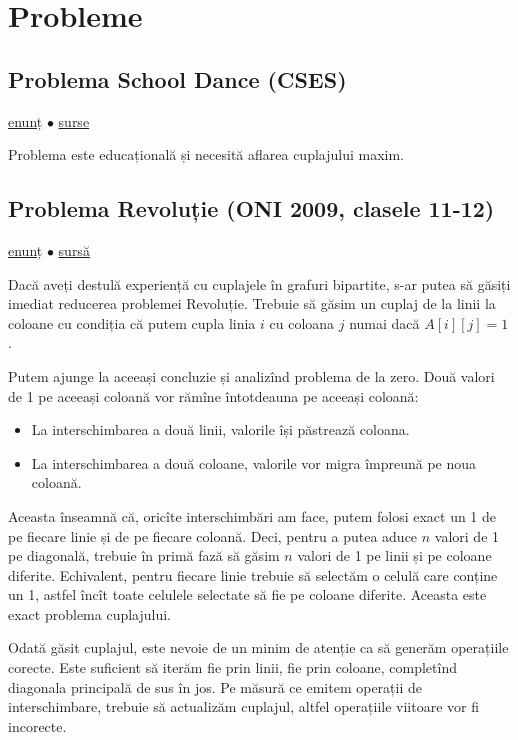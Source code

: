 \documentclass[../main.tex]{subfiles}
\begin{document}
\section{Probleme}

\subsection{Problema School Dance (CSES)}
\label{problem:school-dance}

\href{https://cses.fi/problemset/task/1696}{enunț}
$\bullet$
\hyperref[code:school-dance]{surse}

Problema este educațională și necesită aflarea cuplajului maxim.


\subsection{Problema Revoluție (ONI 2009, clasele 11-12)}
\label{problem:revolutie}

\href{https://kilonova.ro/problems/175}{enunț}
$\bullet$
\hyperref[code:revolutie]{sursă}

Dacă aveți destulă experiență cu cuplajele în grafuri bipartite, s-ar putea să găsiți imediat reducerea problemei Revoluție. Trebuie să găsim un cuplaj de la linii la coloane cu condiția că putem cupla linia $i$ cu coloana $j$ numai dacă $A[i][j] = 1$.

Putem ajunge la aceeași concluzie și analizînd problema de la zero. Două valori de 1 pe aceeași coloană vor rămîne întotdeauna pe aceeași coloană:

\begin{itemize}
  \item La interschimbarea a două linii, valorile își păstrează coloana.
  \item La interschimbarea a două coloane, valorile vor migra împreună pe noua coloană.
\end{itemize}

Aceasta înseamnă că, oricîte interschimbări am face, putem folosi exact un 1 de pe fiecare linie și de pe fiecare coloană. Deci, pentru a putea aduce $n$ valori de 1 pe diagonală, trebuie în primă fază să găsim $n$ valori de 1 pe linii și pe coloane diferite. Echivalent, pentru fiecare linie trebuie să selectăm o celulă care conține un 1, astfel încît toate celulele selectate să fie pe coloane diferite. Aceasta este exact problema cuplajului.

Odată găsit cuplajul, este nevoie de un minim de atenție ca să generăm operațiile corecte. Este suficient să iterăm fie prin linii, fie prin coloane, completînd diagonala principală de sus în jos. Pe măsură ce emitem operații de interschimbare, trebuie să actualizăm cuplajul, altfel operațiile viitoare vor fi incorecte.
\end{document}
